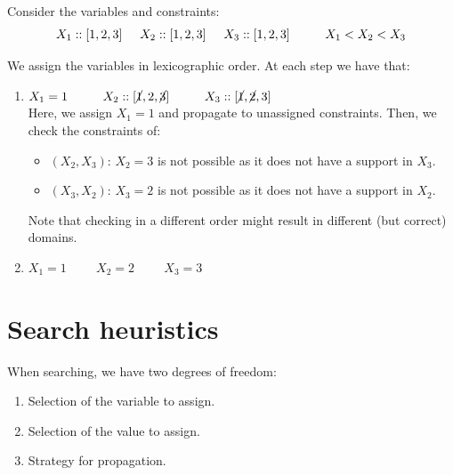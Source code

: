 \begin{description}
        \begin{example}
            Consider the variables and constraints: 
            \[ X_1 :: [1, 2, 3] \hspace{0.5cm} X_2 :: [1, 2, 3] \hspace{0.5cm} X_3 :: [1, 2, 3]  \hspace{1cm}  X_1 < X_2 < X_3 \]

            We assign the variables in lexicographic order. At each step we have that:
            \begin{enumerate}
                \item $X_1 = 1 \hspace{1cm} X_2 :: [\cancel{1}, 2, \cancel{3}] \hspace{1cm} X_3 :: [\cancel{1}, \cancel{2}, 3]$ \\
                    Here, we assign $X_1=1$ and propagate to unassigned constraints.
                    Then, we check the constraints of:
                    \begin{itemize}
                        \item $(X_2, X_3)$: $X_2 = 3$ is not possible as it does not have a support in $X_3$.
                        \item $(X_3, X_2)$: $X_3 = 2$ is not possible as it does not have a support in $X_2$.
                    \end{itemize} 
                    Note that checking in a different order might result in different (but correct) domains.
                \item $X_1 = 1 \hspace{1cm} X_2 = 2 \hspace{1cm} X_3 = 3$
            \end{enumerate}
        \end{example}
\end{description}



\section{Search heuristics}
When searching, we have two degrees of freedom:
\begin{enumerate}
    \item Selection of the variable to assign.
    \item Selection of the value to assign.
    \item Strategy for propagation.
\end{enumerate}

